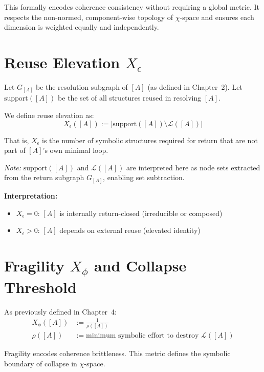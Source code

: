 This formally encodes coherence consistency without requiring a global metric.  
It respects the non-normed, component-wise topology of $\chi$-space and ensures each dimension is weighted equally and independently.

\section{Reuse Elevation $X_\epsilon$} \label{reuse-elevation-xe}

Let $G_{[A]}$ be the resolution subgraph of $[A]$ (as defined in Chapter~2).  
Let $\text{support}([A])$ be the set of all structures reused in resolving $[A]$.

\begin{definition} \label{def:reuse-elevation}
We define reuse elevation as:
\begin{equation} \label{eq:reuse-elevation}
X_\epsilon([A]) := \left| \text{support}([A]) \setminus \mathcal{L}([A]) \right|
\end{equation}
\end{definition}

That is, $X_\epsilon$ is the number of symbolic structures required for return  
that are not part of $[A]$’s own minimal loop.

\textit{Note:} $\text{support}([A])$ and $\mathcal{L}([A])$ are interpreted here as node sets  
extracted from the return subgraph $G_{[A]}$, enabling set subtraction.

\textbf{Interpretation:}
\begin{itemize}
  \item $X_\epsilon = 0$: $[A]$ is internally return-closed (irreducible or composed)
  \item $X_\epsilon > 0$: $[A]$ depends on external reuse (elevated identity)
\end{itemize}

\section{Fragility $X_\phi$ and Collapse Threshold}

As previously defined in Chapter~4:
\begin{align*}
X_\phi([A]) &:= \frac{1}{\rho([A])} \\
\rho([A]) &:= \text{minimum symbolic effort to destroy } \mathcal{L}([A])
\end{align*}

Fragility encodes coherence brittleness.  
This metric defines the symbolic boundary of collapse in $\chi$-space.

